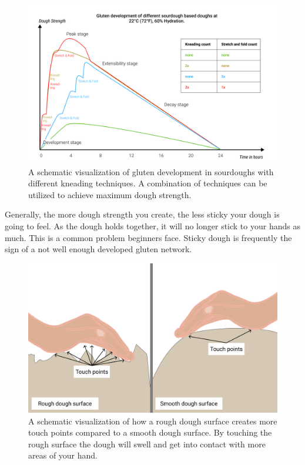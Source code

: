 \begin{figure}[!htb]
  \includegraphics[width=\textwidth]{dough-strength-sourdough}
  \caption[Dough strength over time with kneading]{A schematic visualization
      of gluten development in sourdoughs with different kneading techniques.
      A combination of techniques can be utilized to achieve maximum dough
      strength.}%
  \label{fig:dough-strength-sourdough}
\end{figure}

Generally, the more dough strength you create, the less sticky your dough is going to
feel. As the dough holds together, it will no longer stick to your hands as
much. This is a common problem beginners face. Sticky dough is frequently
the sign of a not well enough developed gluten network.

\begin{figure}[!htb]
  \includegraphics[width=\textwidth]{dough-surface-touchpoints}
  \caption[Touching the dough surface]{A schematic visualization of how a rough
      dough surface creates more touch points compared to a smooth dough
      surface.  By touching the rough surface the dough will swell and get into
      contact with more areas of your hand.}%
  \label{fig:dough-touch-points}
\end{figure}

